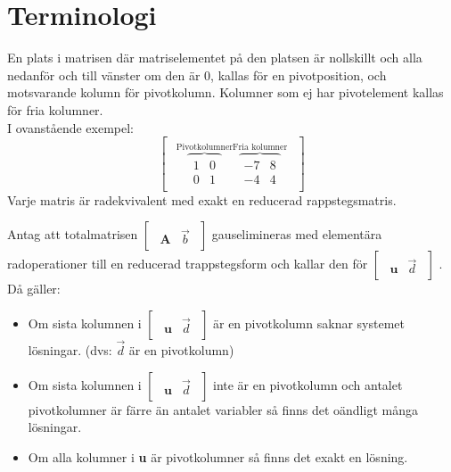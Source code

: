 \section{Terminologi}
En plats i matrisen där matriselementet på den platsen är nollskillt och alla nedanför och till vänster om den är 0, kallas för en pivotposition, och motsvarande kolumn för pivotkolumn. Kolumner som ej har pivotelement kallas för fria kolumner.\\
I ovanstående exempel:
\[
\begin{bmatrix}
\begin{array}{cc}
\overbrace{
    \begin{array}{cc}
        1 & 0\\
        0 & 1
    \end{array}
}^\text{Pivotkolumner}
\overbrace{
    \begin{array}{c|c}
        -7 & 8\\
        -4 & 4
    \end{array}
}^\text{Fria kolumner}
\end{array}
\end{bmatrix}
\]
Varje matris är radekvivalent med exakt en reducerad rappstegsmatris.
\begin{sats}
    Antag att totalmatrisen
    $\begin{bmatrix}
    \begin{array}{c|c}
        \mathbf{A}& \vec{b}
    \end{array}
    \end{bmatrix}$
     gauselimineras med elementära radoperationer till en reducerad trappstegsform och kallar den för
     $\begin{bmatrix}
    \begin{array}{c|c}
        \mathbf{u}& \vec{d}
    \end{array}
    \end{bmatrix}$
    . Då gäller:
    \begin{itemize}
        \item Om sista kolumnen i $\begin{bmatrix}
    \begin{array}{c|c}
        \mathbf{u}& \vec{d}
    \end{array}
    \end{bmatrix}$ är en pivotkolumn saknar systemet lösningar. (dvs: $\vec{d}$ är en pivotkolumn)
    \item Om sista kolumnen i $\begin{bmatrix}
    \begin{array}{c|c}
        \mathbf{u}& \vec{d}
    \end{array}
    \end{bmatrix}$ inte är en pivotkolumn och antalet pivotkolumner är färre än antalet variabler så finns det oändligt många lösningar.
    \item Om alla kolumner i \textbf{u} är pivotkolumner så finns det exakt en lösning.
    \end{itemize}
\end{sats}
